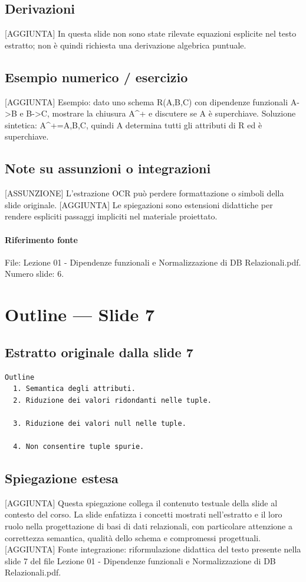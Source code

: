\documentclass[11pt]{article}
\begin{document}
\subsection*{Derivazioni}
[AGGIUNTA] In questa slide non sono state rilevate equazioni esplicite nel testo estratto; non è quindi richiesta una derivazione algebrica puntuale.
\subsection*{Esempio numerico / esercizio}
[AGGIUNTA] Esempio: dato uno schema R(A,B,C) con dipendenze funzionali A->B e B->C, mostrare la chiusura A^+ e discutere se A è superchiave. Soluzione sintetica: A^+={A,B,C}, quindi A determina tutti gli attributi di R ed è superchiave.
\subsection*{Note su assunzioni o integrazioni}
[ASSUNZIONE] L'estrazione OCR può perdere formattazione o simboli della slide originale.
[AGGIUNTA] Le spiegazioni sono estensioni didattiche per rendere espliciti passaggi impliciti nel materiale proiettato.
\paragraph{Riferimento fonte} File: Lezione 01 - Dipendenze funzionali e Normalizzazione di DB Relazionali.pdf. Numero slide: 6.
\section{Outline --- Slide 7}
\subsection*{Estratto originale dalla slide 7}
\begin{lstlisting}
Outline
  1. Semantica degli attributi.
  2. Riduzione dei valori ridondanti nelle tuple.

  3. Riduzione dei valori null nelle tuple.

  4. Non consentire tuple spurie.
\end{lstlisting}
\subsection*{Spiegazione estesa}
[AGGIUNTA] Questa spiegazione collega il contenuto testuale della slide al contesto del corso. La slide enfatizza i concetti mostrati nell'estratto e il loro ruolo nella progettazione di basi di dati relazionali, con particolare attenzione a correttezza semantica, qualità dello schema e compromessi progettuali.
[AGGIUNTA] Fonte integrazione: riformulazione didattica del testo presente nella slide 7 del file Lezione 01 - Dipendenze funzionali e Normalizzazione di DB Relazionali.pdf.
\end{document}
